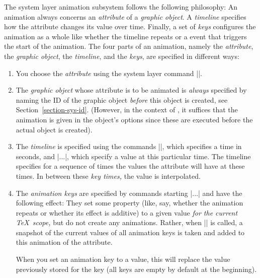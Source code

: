 \begin{command}{\pgfsys@animate{}}
    The system layer animation subsystem follows the following philosophy: An
    animation always concerns an \emph{attribute} of a \emph{graphic object}. A
    \emph{timeline} specifies how the attribute changes its value over time.
    Finally, a set of \emph{keys} configures the animation as a whole like
    whether the timeline repeats or a event that triggers the start of the
    animation. The four parts of an animation, namely the \emph{attribute}, the
    \emph{graphic object}, the \emph{timeline}, and the \emph{keys}, are
    specified in different ways:
    \begin{enumerate}
        \item You choose the \emph{attribute} using the system layer command
            |\pgfsysanimate|.
        \item The \emph{graphic object} whose attribute is to be animated is
            \emph{always} specified by naming the ID of the graphic object
            \emph{before} this object is created, see
            Section~\ref{section-sys-id}. (However, in the context of
            \tikzname, it suffices that the animation is given in the object's
            options since these are executed before the actual object is
            created).
        \item The \emph{timeline} is specified using the commands
            |\pgfsysanimkeytime|, which specifies a time in seconds, and
            |\pgfsys@animation@val...|, which specify a value at this
            particular time. The timeline specifies for a sequence of times the
            values the attribute will have at these times. In between these
            \emph{key times,} the value is interpolated.
        \item The \emph{animation keys} are specified by commands starting
            |\pgfsys@animation@...| and have the following effect: They set
            some property (like, say, whether the animation repeats or whether
            its effect is additive) to a given value \emph{for the current
            \TeX\ scope,} but do not create any animations. Rather, when
            |\pgfsysanimate| is called, a snapshot of the current values of all
            animation keys is taken and added to this animation of the
            attribute.

            When you set an animation key to a value, this will replace the
            value previously stored for the key (all keys are empty by default
            at the beginning).


\end{enumerate}
\end{command}
